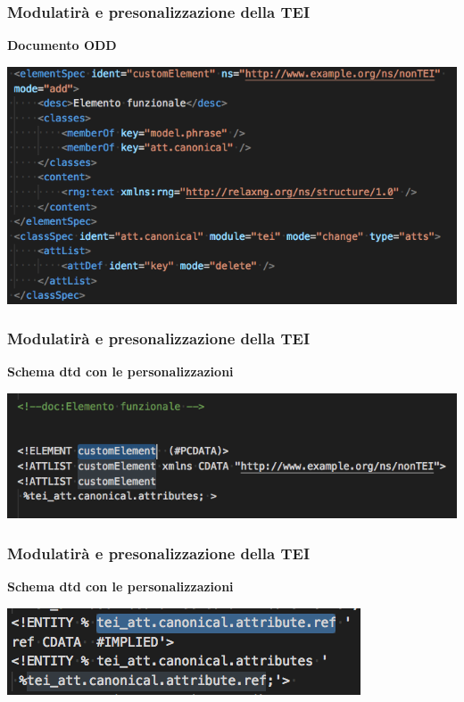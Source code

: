 \begin{frame}
    \frametitle{Modulatirà e presonalizzazione della TEI}
    \addtocounter{nframe}{1}
    
    \textbf{Documento ODD}

     \begin{center}
        \includegraphics[width=.95\textwidth]{imgs/CustomizationODD-2.png}
     \end{center}
    
\end{frame}

\begin{frame}
    \frametitle{Modulatirà e presonalizzazione della TEI}
    \addtocounter{nframe}{1}
    
    \textbf{Schema dtd con le personalizzazioni}

     \begin{center}
        \includegraphics[width=.97\textwidth]{imgs/TEI-Custom-DTD.png}
     \end{center}
   
    
\end{frame}

\begin{frame}
    \frametitle{Modulatirà e presonalizzazione della TEI}
    \addtocounter{nframe}{1}
    
    \textbf{Schema dtd con le personalizzazioni}

     \begin{center}
        \includegraphics[width=.9\textwidth]{imgs/TEI-Custom-DTD-2.png}
     \end{center}
   
    
\end{frame}



